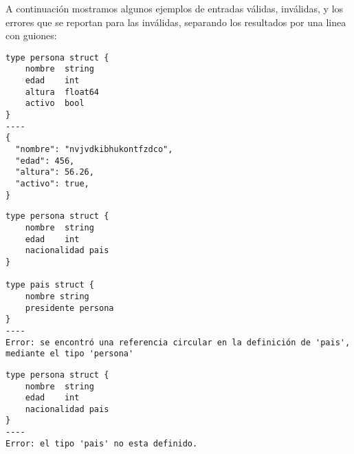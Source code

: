 A continuación mostramos algunos ejemplos de entradas válidas, inválidas, y los
errores que se reportan para las inválidas, separando los resultados por una
linea con guiones:

\begin{lstlisting}[caption=Ejemplo válido]
type persona struct {
    nombre  string
    edad    int
    altura  float64
    activo  bool
}
----
{
  "nombre": "nvjvdkibhukontfzdco",
  "edad": 456,
  "altura": 56.26,
  "activo": true,
}
\end{lstlisting}

\newpage

\begin{lstlisting}[caption=Ejemplo inválido: ciclos]
type persona struct {
    nombre  string
    edad    int
    nacionalidad pais
}

type pais struct {
    nombre string
    presidente persona
}
----
Error: se encontró una referencia circular en la definición de 'pais', mediante el tipo 'persona'
\end{lstlisting}

\begin{lstlisting}[caption=Ejemplo inválida: no definido]
type persona struct {
    nombre  string
    edad    int
    nacionalidad pais
}
----
Error: el tipo 'pais' no esta definido.
\end{lstlisting}
